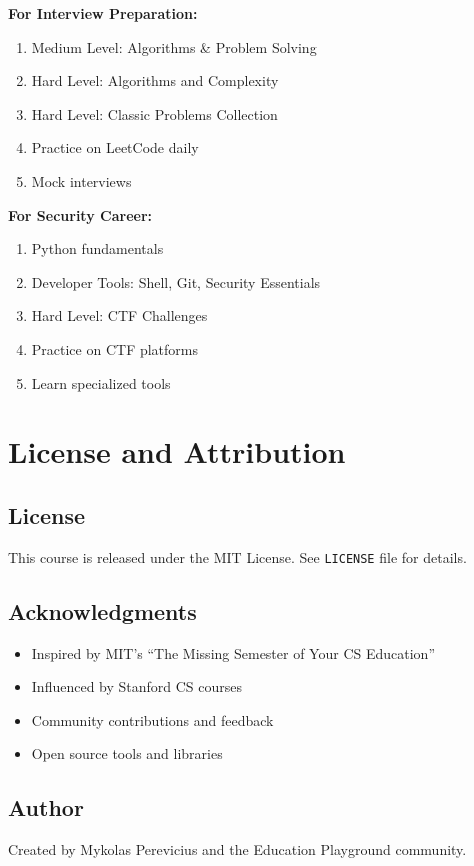 \documentclass[11pt,letterpaper]{article}
\begin{document}
\textbf{For Interview Preparation:}
\begin{enumerate}[leftmargin=*]
    \item Medium Level: Algorithms \& Problem Solving
    \item Hard Level: Algorithms and Complexity
    \item Hard Level: Classic Problems Collection
    \item Practice on LeetCode daily
    \item Mock interviews
\end{enumerate}

\textbf{For Security Career:}
\begin{enumerate}[leftmargin=*]
    \item Python fundamentals
    \item Developer Tools: Shell, Git, Security Essentials
    \item Hard Level: CTF Challenges
    \item Practice on CTF platforms
    \item Learn specialized tools
\end{enumerate}

\section{License and Attribution}

\subsection{License}
This course is released under the MIT License. See \texttt{LICENSE} file for details.

\subsection{Acknowledgments}
\begin{itemize}[leftmargin=*]
    \item Inspired by MIT's ``The Missing Semester of Your CS Education''
    \item Influenced by Stanford CS courses
    \item Community contributions and feedback
    \item Open source tools and libraries
\end{itemize}

\subsection{Author}
Created by Mykolas Perevicius and the Education Playground community.
\end{document}
